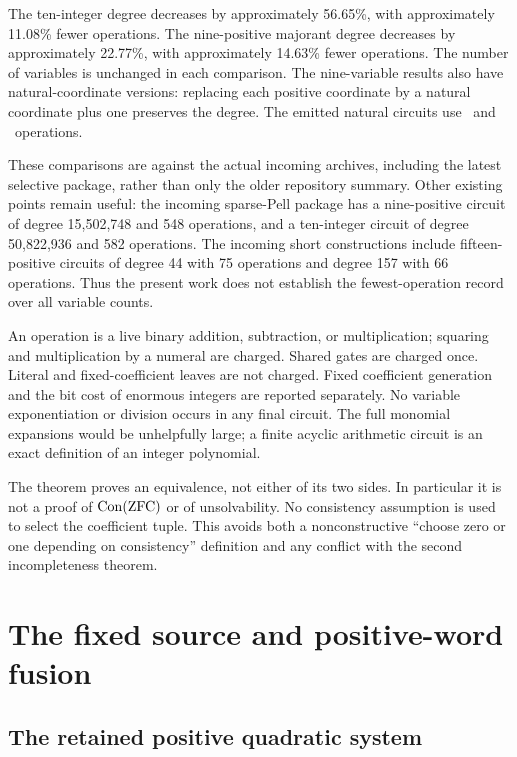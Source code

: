 \documentclass[11pt,a4paper]{article}
\theoremstyle{definition}\newtheorem{definition}[theorem]{Definition}
\theoremstyle{remark}\newtheorem{remark}[theorem]{Remark}
\begin{document}
The ten-integer degree decreases by approximately 56.65\%, with approximately
11.08\% fewer operations. The nine-positive majorant degree decreases by
approximately 22.77\%, with approximately 14.63\% fewer operations.
The number of variables is unchanged in each comparison. The nine-variable
results also have natural-coordinate versions: replacing each positive
coordinate by a natural coordinate plus one preserves the degree. The
emitted natural circuits use \NineNatOps\ and \FastNatOps\ operations.

These comparisons are against the actual incoming archives, including the
latest selective package, rather than only the older repository summary.
Other existing points remain useful: the incoming sparse-Pell package has
a nine-positive circuit of degree 15,502,748 and 548 operations, and a
ten-integer circuit of degree 50,822,936 and 582 operations. The incoming
short constructions include fifteen-positive circuits of degree 44 with
75 operations and degree 157 with 66 operations. Thus the present work does
not establish the fewest-operation record over all variable counts.

An operation is a live binary addition, subtraction, or multiplication;
squaring and multiplication by a numeral are charged. Shared gates are
charged once. Literal and fixed-coefficient leaves are not charged. Fixed
coefficient generation and the bit cost of enormous integers are reported
separately. No variable exponentiation or division occurs in any final
circuit. The full monomial expansions would be unhelpfully large; a finite
acyclic arithmetic circuit is an exact definition of an integer polynomial.

The theorem proves an equivalence, not either of its two sides. In
particular it is not a proof of $\operatorname{Con}(\mathrm{ZFC})$ or of unsolvability.
No consistency assumption is used to select the coefficient tuple. This
avoids both a nonconstructive ``choose zero or one depending on consistency''
definition and any conflict with the second incompleteness theorem.

\section{The fixed source and positive-word fusion}\label{sec:source}

\subsection{The retained positive quadratic system}
\end{document}
